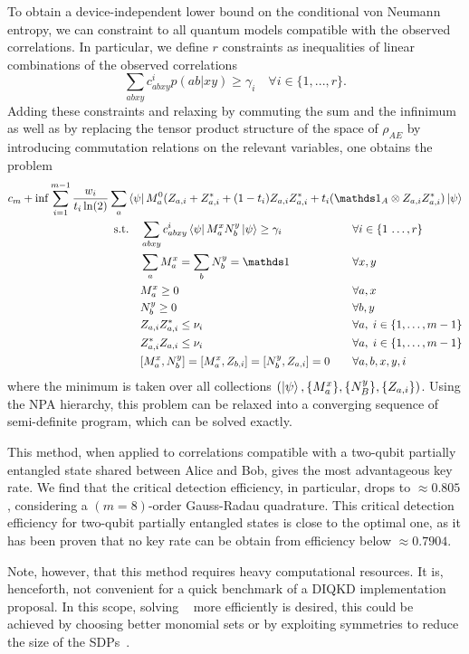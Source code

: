 To obtain a device-independent lower bound on the conditional von Neumann entropy, we can constraint  to all quantum models compatible with the observed correlations. 
In particular, we define $r$ constraints as inequalities of linear combinations of the observed correlations 
\begin{equation}
	\sum_{abxy}c^i_{abxy}p(ab|xy) \geq \gamma_i \quad \forall i\in\{1,...,r\}.
\end{equation}
Adding these constraints and relaxing  by commuting the sum and the infinimum as well as by replacing the tensor product structure of the space of $\rho_{AE}$ by introducing commutation relations on the relevant variables, one obtains the problem 
\begin{equation}
	\begin{aligned}
		c_m + \inf \sum_{i=1}^{m-1}\frac{w_i}{t_i\ln(2)}\sum_a 	\bra{\psi} M_a^0(Z_{a,i}+ Z_{a,i}^* +(1-t_i)Z_{a,i}Z_{a,i}^*+t_i(\id_A\otimes Z_{a,i} Z_{a,i}^*)\ket{\psi} \\
	\begin{alignedat}{3}
			  &\text{s.t.}\quad && \sum_{abxy} c^i_{abxy}\bra{\psi} M_a^x N_b^y \ket{\psi} \geq \gamma_i  &&\forall i\in\{1\,\dots,r\} \\
			  & && \sum_a M_a^x = \sum_b N_b^y = \id &&\forall x,y\\
			  & && M_a^x \geq 0 && \forall a,x\\
			  & && N_b^y \geq 0 && \forall b,y\\
			  & && Z_{a,i}Z_{a,i}^* \leq \nu_i &&\forall a, \; i\in\{1,\dots,m-1\} \\
			  & && Z_{a,i}^*Z_{a,i} \leq \nu_i &&\forall a, \; i\in\{1,\dots,m-1\} \\
			  & && [M_a^x,N_b^y]=[M_a^x,Z_{b,i}]=[N_b^y,Z_{a,i}] = 0 \qquad&&\forall a,b,x,y,i
	\end{alignedat}
	\end{aligned}
	\label{eq:NPA_DIQKD}
\end{equation}
where the minimum is taken over all collections $(\ket{\psi},\{M_a^x\},\{N_B^y\},\{Z_{a,i}\})$.
Using the NPA hierarchy, this problem can be relaxed into a converging sequence of semi-definite program, which can be solved exactly.

\medbreak

This method, when applied to correlations compatible with a two-qubit partially entangled state shared between Alice and Bob, gives the most advantageous key rate. 
We find that the critical detection efficiency, in particular, drops to $\approx 0.805$, considering a $(m=8)$-order Gauss-Radau quadrature.
This critical detection efficiency for two-qubit partially entangled states is close to the optimal one, as it has been proven that no key rate can be obtain from efficiency below $\approx 0.7904$\cite{Lukanowski2022}.

Note, however, that this method requires heavy computational resources.
It is, henceforth, not convenient for a quick benchmark of a DIQKD implementation proposal.
In this scope, solving ~ more efficiently is desired, this could be achieved by choosing better monomial sets or by exploiting symmetries to reduce the size of the SDPs~\cite{Rosset2021}.

